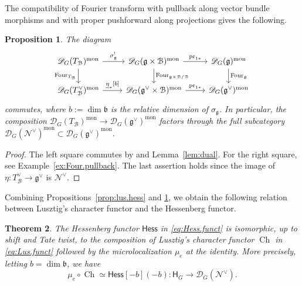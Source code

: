 \documentclass[11pt]{amsart}
\numberwithin{equation}{section}
\newtheorem{theorem}{Theorem}[section]
\newtheorem{proposition}[theorem]{Proposition}
\theoremstyle{definition}
\def\lra{\longrightarrow }
\DeclareMathOperator{\mon}{mon}
\DeclareMathOperator{\Four}{Four}
\def\cB{\mathcal {B}}
\def\fg{\mathfrak {g}}
\def\fb{\mathfrak {b}}
\def\pr{\mathrm{pr}}
\DeclareMathOperator{\Ch}{\mathrm{Ch}}
\begin{document}
The compatibility of Fourier transform with pullback along vector bundle morphisms and with proper pushforward along projections gives the following.

\begin{proposition}\label{prop:fourier.comparison}
The diagram
\[
\begin{tikzcd}
\mathscr D_{G}(T_{\cB})^{\mon}
\arrow[r,"\sigma_{\fg}^!"]
\arrow[d,"\Four_{T_{\cB}}"']
&
\mathscr D_{G}(\fg\times \cB)^{\mon}
\arrow[r,"\pr_{1*}"]
\arrow[d,"\Four_{\fg\times\cB/\cB}"]
&
\mathscr D_{G}(\fg)^{\mon}
\arrow[d,"\Four_{\fg}"]
\\
\mathscr D_{G}(T_{\cB}^\vee)^{\mon}
\arrow[r,"\underline{\eta}_*\lbrack b\rbrack"]
&
\mathscr D_{G}(\fg^\vee\times \cB)^{\mon}
\arrow[r,"\pr_{1*}"]
&
\mathscr D_{G}(\fg^\vee)^{\mon}
\end{tikzcd}
\]
commutes, where $b:=\dim \fb$ is the relative dimension of $\sigma_\fg$. In particular,  the composition $\mathscr D_{G}(T_\cB)^{\mon}\to \mathscr D_{G}(\fg^\vee)^{\mon}$ factors through the full subcategory $\mathscr D_{G}(\mathcal N^\vee)^{\mon}\subset \mathscr D_{G}(\fg^\vee)^{\mon}$.
\end{proposition}

\begin{proof}
The left square commutes by \cite[Lemma~A.3.5]{bezrukavnikov2026affinespringerfibersmall} %
and Lemma~\ref{lem:dual}. %
For the right square, see Example~\ref{ex:Four.pullback}.
The last assertion holds since the image of $\eta:T_{\cB}^\vee\to \fg^\vee$ is $\mathcal N^\vee$.
\end{proof}

Combining Propositions~\ref{prop:lus.hess} and \ref{prop:fourier.comparison}, we obtain the following relation between Lusztig's character functor and the Hessenberg functor.

\begin{theorem}\label{thm:lus.hess}
The Hessenberg functor $\mathsf{Hess}$ in \eqref{eq:Hess.funct} is isomorphic, up to shift and Tate twist, to the composition of Lusztig's character functor $\Ch$ in \eqref{eq:Lus.funct} followed by the microlocalization $\mu_e$ at the identity.
More precisely, letting $b=\dim \fb$, we have
\[\mu_e\circ\Ch\simeq \mathsf{Hess}[-b](-b):\mathsf H_G\lra \mathscr D_G(\mathcal N^\vee).\]
\end{theorem}
\end{document}

